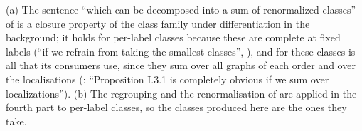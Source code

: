 \begin{remark}\label{sup3:rem:S14b}
(a) The sentence ``which can be decomposed into a sum of renormalized classes'' of \cite[p.~433]{Ba3} is a closure property of the class family under differentiation in the background; it holds for per-label classes because these are complete at fixed labels (``if we refrain from taking the smallest classes'', \cite[p.~431]{Ba3}), and \cite[Prop.~1]{Ba3} for these classes is all that its consumers use, since they sum over all graphs of each order and over the localisations (\cite[p.~421]{Ba3}: ``Proposition I.3.1 is completely obvious if we sum over localizations''). (b) The regrouping and the renormalisation of \cite[pp.~434--445]{Ba3} are applied in the fourth part to per-label classes, so the classes produced here are the ones they take.
\end{remark}
